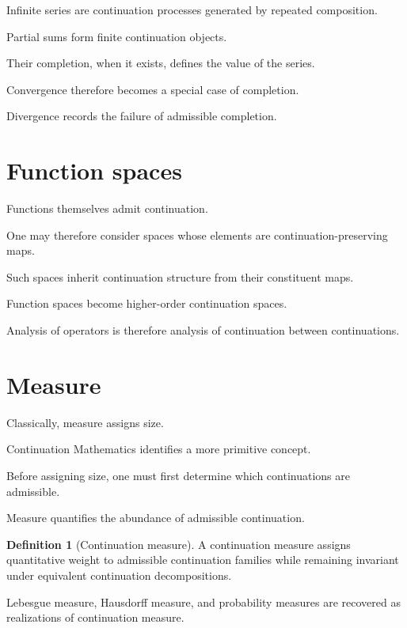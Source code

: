 \documentclass[13pt,openany]{book}
\theoremstyle{plain}
\theoremstyle{definition}
\newtheorem{definition}{Definition}[chapter]
\begin{document}
Infinite series are continuation processes generated by repeated composition.

Partial sums form finite continuation objects.

Their completion, when it exists, defines the value of the series.

Convergence therefore becomes a special case of completion.

Divergence records the failure of admissible completion.

\section{Function spaces}

Functions themselves admit continuation.

One may therefore consider spaces whose elements are continuation-preserving
maps.

Such spaces inherit continuation structure from their constituent maps.

Function spaces become higher-order continuation spaces.

Analysis of operators is therefore analysis of continuation between
continuations.

\section{Measure}

Classically, measure assigns size.

Continuation Mathematics identifies a more primitive concept.

Before assigning size, one must first determine which continuations are
admissible.

Measure quantifies the abundance of admissible continuation.

\begin{definition}[Continuation measure]
A continuation measure assigns quantitative weight to admissible continuation
families while remaining invariant under equivalent continuation
decompositions.
\end{definition}

Lebesgue measure, Hausdorff measure, and probability measures are recovered as
realizations of continuation measure.
\end{document}
